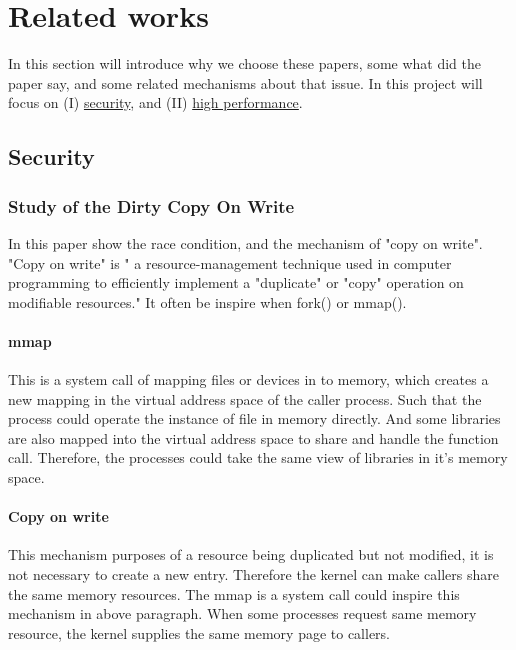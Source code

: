 \documentclass[12pt,a4paper]{IEEEconf}
\begin{document}

\section{Related works}
In this section will introduce why we choose these papers, some what did the paper say, and
some related mechanisms about that issue.
In this project will focus on (\RN{1}) \hyperlink{security}{security}, and (\RN{2})
\hyperlink{heigh_performance}{high performance}.

\hypertarget{security}{\subsection{Security}}
\subsubsection{Study of the Dirty Copy On Write}
In this paper\cite{Study_Dirty_Cow} show the race condition, and the mechanism of
"copy on write". "Copy on write" is " a resource-management technique used in
computer programming to efficiently implement a "duplicate" or "copy" operation
on modifiable resources." \cite{CoW_wiki} It often be inspire when fork() or mmap().

\paragraph{mmap}
This is a system call of mapping files or devices in to memory, which creates a
new mapping in the virtual address space of the caller process. Such that
the process could operate the instance of file in memory directly.
And some libraries are also mapped into the virtual address space to share and handle
the function call. Therefore, the processes could take the same view of libraries in
it's memory space.

\paragraph{Copy on write}
This mechanism purposes of a resource being duplicated but not modified, it is not
necessary to create a new entry. Therefore the kernel can make callers share
the same memory resources. The mmap is a system call could inspire this mechanism
in above paragraph. When some processes request same memory resource, the kernel
supplies the same memory page to callers.
\end{document}
